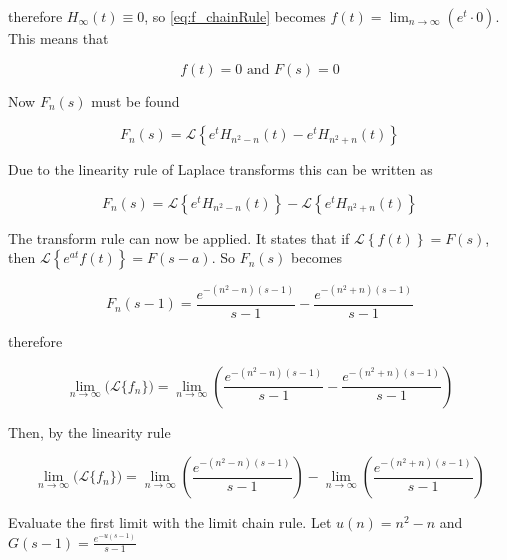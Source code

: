 \documentclass[a4paper,10pt,reqno]{amsart}
\numberwithin{equation}{section}
\newcommand{\lap}{\mathscr{L}}
\begin{document}
therefore $H_{\infty}(t) \equiv 0$, so \eqref{eq:f_chainRule} becomes $f(t) = \lim_{n \to \infty} (e^t \cdot 0)$. This means that

\begin{equation}
     f(t) = 0 \text{ and } F(s) = 0 \label{eq:F}
\end{equation}
\vspace{1pt}

Now $F_n(s)$ must be found

\begin{equation}
     F_n(s) = \lap\left\{e^t H_{n^2 - n}(t) - e^t H_{n^2 + n}(t)\right\}
\end{equation}
\vspace{1pt}

Due to the linearity rule of Laplace transforms this can be written as

\begin{equation}
     F_n(s) = \lap\left\{e^t H_{n^2 - n}(t)\right\} - \lap\left\{e^t H_{n^2 + n}(t)\right\}
\end{equation}
\vspace{1pt}

The transform rule can now be applied. It states that if $\lap\left\{f(t)\right\} = F(s)$, then $\lap\left\{e^{at} f(t)\right\} = F(s - a)$. So $F_n(s)$ becomes

\begin{equation}
     F_n(s - 1) = \frac{e^{-(n^2 - n)(s-1)}}{s-1} - \frac{e^{-(n^2 + n)(s-1)}}{s-1}
\end{equation}
\vspace{1pt}

therefore

\begin{equation}
     \lim_{n \to \infty} \big(\lap\{f_n\}\big) = \lim_{n \to \infty} \left(\frac{e^{-(n^2 - n)(s-1)}}{s-1} - \frac{e^{-(n^2 + n)(s-1)}}{s-1}\right)
\end{equation}
\vspace{1pt}

Then, by the linearity rule

\begin{equation}
     \lim_{n \to \infty} \big(\lap\{f_n\}\big) = \lim_{n \to \infty} \left(\frac{e^{-(n^2 - n)(s-1)}}{s-1}\right) - \lim_{n \to \infty}\left(\frac{e^{-(n^2 + n)(s-1)}}{s-1}\right)
\end{equation}
\vspace{1pt}

Evaluate the first limit with the limit chain rule. Let $u(n) = n^2 - n$ and $G(s - 1) = \frac{e^{-u(s - 1)}}{s - 1}$
\end{document}
